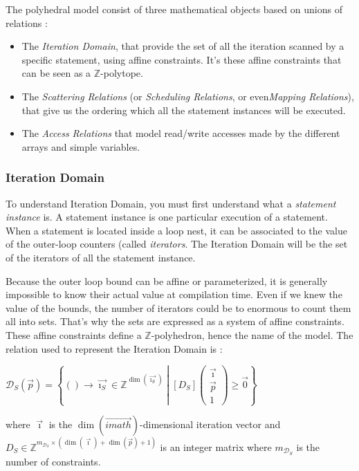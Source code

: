 \documentclass[paper=a4, fontsize=11pt]{scrartcl}
\numberwithin{equation}{section}        %
\numberwithin{figure}{section}          %
\numberwithin{table}{section}               %
\begin{document}
        The polyhedral model consist of three mathematical objects based on unions of relations :
        \begin{itemize}
            \item The \textit{Iteration Domain}, that provide the set of all the iteration scanned
                by a specific statement, using affine constraints. It's these affine constraints 
                that can be seen as a $\mathbb{Z}$-polytope.
            \item The \textit{Scattering Relations} (or \textit{Scheduling Relations},
                or even\textit{Mapping Relations}), that give us the ordering which
                all the statement instances will be executed.
            \item The \textit{Access Relations} that model read/write accesses made by
                the different arrays and simple variables.
        \end{itemize}

            \subsubsection{Iteration Domain}
                To understand Iteration Domain, you must first understand what a \textit{statement instance}
                is. A statement instance is one particular execution of a statement.
                When a statement is located inside a loop nest, it can be associated to the value
                of the outer-loop counters (called \textit{iterators}.
                The Iteration Domain will be the set of the iterators of all the statement
                instance.

                Because the outer loop bound can be affine or parameterized, it is generally impossible to
                know their actual value at compilation time. Even if we knew the value of the
                bounds, the number of iterators could be to enormous to count them all into sets.
                That's why the sets are expressed as a system of affine constraints.
                These affine constraints define a $\mathbb{Z}$-polyhedron, hence the name of the model.
                The relation used to represent the Iteration Domain is :
                \begin{center}
                    $ \mathcal{D}_S(\vec{p}) = \left\{() \to \vec{\imath_S} \in \mathbb{Z}^{\dim(\vec{\imath_S})}
                    \middle|
                    \left[D_S\right]\begin{pmatrix}\vec{\imath} \\ \vec{p} \\ 1\end{pmatrix}
                    \geq \vec{0}
                    \right\}$
                \end{center}
                where $\vec{\imath}$ is the $\dim(\vec{imath})$-dimensional iteration vector and
                $D_S \in \mathbb{Z}^{m_{\mathcal{D}_S} \times (\dim(\vec{\imath})+\dim(\vec{p})+1)}$
                is an integer matrix where $m_{\mathcal{D}_S}$ is the number of constraints.
                \\
\end{document}
